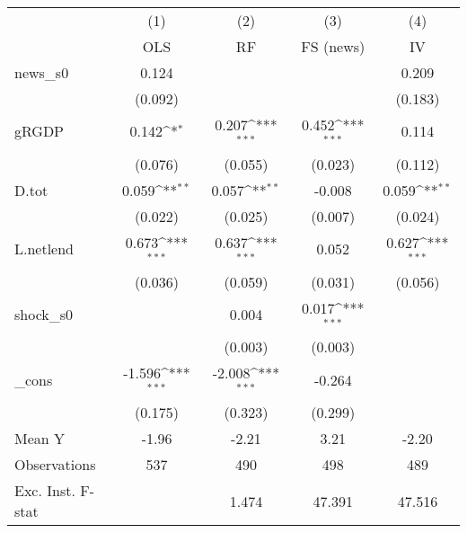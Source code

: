 {
\def\sym#1{\ifmmode^{#1}\else\(^{#1}\)\fi}
\begin{tabular}{l*{4}{c}}
\toprule
            &\multicolumn{1}{c}{(1)}&\multicolumn{1}{c}{(2)}&\multicolumn{1}{c}{(3)}&\multicolumn{1}{c}{(4)}\\
            &\multicolumn{1}{c}{OLS}&\multicolumn{1}{c}{RF}&\multicolumn{1}{c}{FS (news)}&\multicolumn{1}{c}{IV}\\
\midrule
news\_s0     &       0.124         &                     &                     &       0.209         \\
            &     (0.092)         &                     &                     &     (0.183)         \\
\addlinespace
gRGDP       &       0.142\sym{*}  &       0.207\sym{***}&       0.452\sym{***}&       0.114         \\
            &     (0.076)         &     (0.055)         &     (0.023)         &     (0.112)         \\
\addlinespace
D.tot       &       0.059\sym{**} &       0.057\sym{**} &      -0.008         &       0.059\sym{**} \\
            &     (0.022)         &     (0.025)         &     (0.007)         &     (0.024)         \\
\addlinespace
L.netlend   &       0.673\sym{***}&       0.637\sym{***}&       0.052         &       0.627\sym{***}\\
            &     (0.036)         &     (0.059)         &     (0.031)         &     (0.056)         \\
\addlinespace
shock\_s0    &                     &       0.004         &       0.017\sym{***}&                     \\
            &                     &     (0.003)         &     (0.003)         &                     \\
\addlinespace
\_cons      &      -1.596\sym{***}&      -2.008\sym{***}&      -0.264         &                     \\
            &     (0.175)         &     (0.323)         &     (0.299)         &                     \\
\midrule
Mean Y      &       -1.96         &       -2.21         &        3.21         &       -2.20         \\
Observations&         537         &         490         &         498         &         489         \\
Exc. Inst. F-stat&                     &       1.474         &      47.391         &      47.516         \\
\bottomrule
\end{tabular}
}
